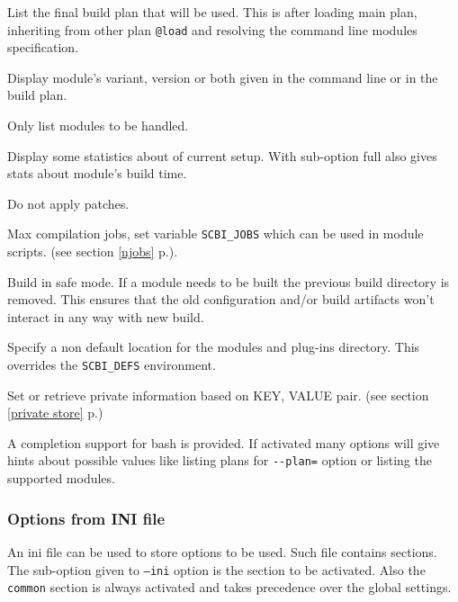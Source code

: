 \documentclass[a4paper,12pt,twoside]{article}
\newcommand{\code}[1]{\texttt{#1}}
\newcommand{\seeref}[1]{see section \ref{#1} p.\pageref{#1}}
\newcommand{\ddash}{-{}-}
\begin{document}
\begin{description}[font=\texttt]
	\item[\ddash{}list-plan] List the final build plan that will be used. This is after loading main plan, inheriting from other plan \code{@load} and resolving the command line modules specification.

	\item[\ddash{}module-ref:{[}version|variant|full{]} ] Display module's variant, version or both given in the command line or in the build plan.

	\item[\ddash{}dry-run] Only list modules to be handled.

	\item[\ddash{}stat:{[}full{]}] Display some statistics about of current setup. With sub-option full also gives stats about module's build time.

	\item[-n | \ddash{}no-patch] Do not apply patches.

	\item[-j | \ddash{}jobs=<n>] Max compilation jobs, set variable \code{SCBI\_JOBS} which can be used in module scripts. (\seeref{njobs}).

	\item[\ddash{}safe] Build in safe mode. If a module needs to be built the previous build directory is removed. This ensures that the old configuration and/or build artifacts won't interact in any way with new build.

	\item[\ddash{}plugins=<directory>] Specify a non default location for the modules and plug-ins directory. This overrides the \code{SCBI\_DEFS} environment.

	\item[\ddash{}store <KEY> <VALUE>] Set or retrieve private information based on KEY, VALUE pair. (\seeref{private store})

\end{description}

A completion support for bash is provided. If activated many options will give hints about possible values like listing plans for \code{\ddash{}plan=} option or listing the supported modules.

\subsubsection{Options from INI file}
\label{inifile}

An ini file can be used to store options to be used. Such file contains sections. The sub-option given to \code{--ini} option is the section to be activated. Also the \code{common} section is always activated and takes precedence over the global settings.
\end{document}
